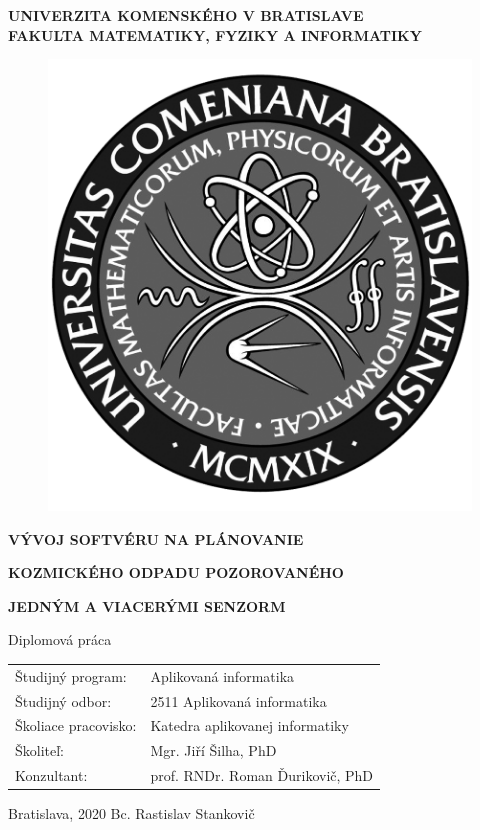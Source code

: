 \documentclass[12pt, a4paper, oneside]{book}
\newcommand\mfthesistype{Diplomová práca}
\newcommand\mfauthor{Bc. Rastislav Stankovič}
\newcommand\mfadvisor{Mgr. Jiří Šilha, PhD}
\newcommand\mfplacedate{Bratislava, 2020}
\newcommand\mfuniversity{UNIVERZITA KOMENSKÉHO V BRATISLAVE}
\newcommand\mffaculty{FAKULTA MATEMATIKY, FYZIKY A INFORMATIKY}
\begin{document}
\thispagestyle{empty}

\noindent
\begin{minipage}{\textwidth}
\begin{center}
\textbf{\mfuniversity \\
\mffaculty}
\end{center}
\end{minipage}

\vfill
\begin{figure}[!hbt]
\begin{center}
\includegraphics{images/logo_fmph_dark}
\label{img:logo_dark}
\end{center}
\end{figure}
\begin{center}
\begin{minipage}{0.8\textwidth}
		\centerline{\textbf{\Large\MakeUppercase{Vývoj softvéru na plánovanie}}}
		\centerline{\textbf{\Large\MakeUppercase{kozmického odpadu pozorovaného}}}
                      \centerline{\textbf{\Large\MakeUppercase{jedným a viacerými senzorm}}}
\smallskip
\centerline{\mfthesistype}
\end{minipage}
\end{center}
\vfill
\begin{tabular}{l l}
Študijný program: & Aplikovaná informatika\\
Študijný odbor: & 2511 Aplikovaná informatika\\
Školiace pracovisko: & Katedra aplikovanej informatiky\\
Školiteľ: & \mfadvisor \\
Konzultant: & prof. RNDr. Roman Ďurikovič, PhD
\end{tabular}
\vfill
\noindent
\mfplacedate \hfill
\mfauthor
\eject 
\thispagestyle{empty}
\end{document}
